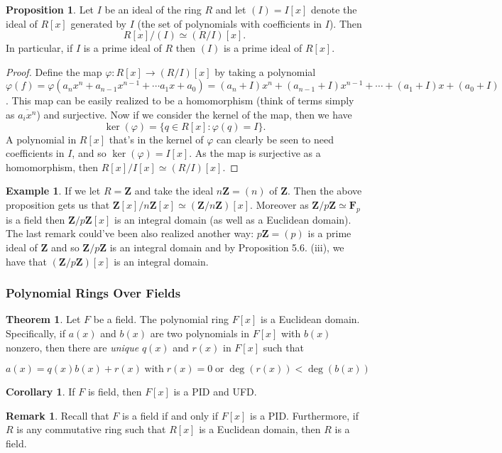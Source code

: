 \documentclass[9pt,reqno]{amsart}
\theoremstyle{definition}
\newtheorem{theorem}{Theorem}[section]
\newtheorem{rem}{Remark}[section]
\newtheorem{prop}{Proposition}[section]
\newtheorem{coro}{Corollary}[section]
\newtheorem{ex}{Example}[section]
\newcommand{\zz}{\mathbf Z}
\begin{document}
\begin{prop}
Let $I$ be an ideal of the ring $R$ and let $(I) = I[x]$ denote the ideal of $R[x]$ generated by $I$ (the set of polynomials with coefficients in $I$). Then $$R[x] / (I) \simeq (R/I) [x].$$
In particular, if $I$ is a prime ideal of $R$ then $(I)$ is a prime ideal of $R[x]$. 
\end{prop}
\begin{proof}
	Define the map $\varphi \colon R[x] \to (R/I) [x]$ by taking a polynomial $ \varphi (f) = \varphi (a_n x^n + a_{n-1}x^{n-1} + \cdots a_1 x +a_0) = (a_n + I)x^n + (a_{n-1} + I)x^{n-1} + \cdots + (a_1 + I)x + (a_0 + I)$. This map can be easily realized to be a homomorphism (think of terms simply as $\overline{a_i x^n}$) and surjective. Now if we consider the kernel of the map, then we have $$ \ker (\varphi) = \{ q \in R[x] \colon \varphi (q) = I \}. $$ A polynomial in $R[x]$ that's in the kernel of $\varphi$ can clearly be seen to need coefficients in $I$, and so $\ker (\varphi) = I[x]$. As the map is surjective as a homomorphism, then $R[x]/I[x] \simeq (R/I)[x]$. 
\end{proof}
\begin{ex}
	If we let $R = \zz$ and take the ideal $n\zz = (n)$ of $\zz$. Then the above proposition gets us that $\zz [x] / n\zz [x]  \simeq (\zz / n \zz) [x]$.  Moreover as $\zz / p \zz \simeq \mathbf{F}_p$ is a field then $\zz/ p \zz [x]$ is an integral domain (as well as a Euclidean domain). The last remark could've been also realized another way: $p \zz = (p)$ is a prime ideal of $\zz$ and so $\zz / p \zz$ is an integral domain and by Proposition 5.6. (iii), we have that $(\zz / p \zz) [x]$ is an integral domain. 
\end{ex}
\subsubsection{Polynomial Rings Over Fields} 

\begin{theorem}
	Let $F$ be a field. The polynomial ring $F[x]$ is a Euclidean domain. Specifically, if $a(x)$ and $b(x)$ are two polynomials in $F[x]$ with $b(x)$ nonzero, then there are \textit{unique} $q(x)$ and $r(x)$ in $F[x]$ such that 
	
$$a(x) = q(x) b(x) + r(x) \; \text{with} \; r(x) = 0 \; \text{or} \; \deg(r(x)) < \deg (b(x))$$
\end{theorem}

\begin{coro}
If $F$ is field, then $F[x]$ is a PID and UFD. 	
\end{coro}
\begin{rem}
Recall that $F$ is a field if and only if $F[x]$ is a PID. Furthermore, if $R$ is any commutative ring such that $R[x]$ is a Euclidean domain, then $R$ is a field. 
\end{rem}
\end{document}
